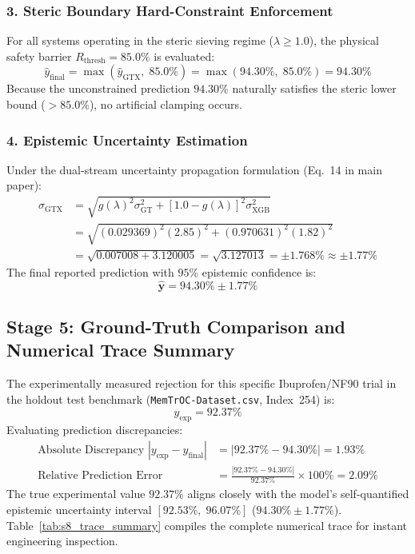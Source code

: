 \documentclass[11pt]{article}
\begin{document}
\subsubsection{3. Steric Boundary Hard-Constraint Enforcement}
For all systems operating in the steric sieving regime ($\lambda \ge 1.0$), the physical safety barrier $R_{\mathrm{thresh}} = 85.0\%$ is evaluated:
\begin{equation}
\hat{y}_{\mathrm{final}} = \max\left(\hat{y}_{\mathrm{GTX}}, \; 85.0\%\right) = \max(94.30\%, \; 85.0\%) = \mathbf{94.30\%}
\end{equation}
Because the unconstrained prediction $94.30\%$ naturally satisfies the steric lower bound ($>85.0\%$), no artificial clamping occurs.

\subsubsection{4. Epistemic Uncertainty Estimation}
Under the dual-stream uncertainty propagation formulation (Eq.~14 in main paper):
\begin{align}
\sigma_{\mathrm{GTX}} &= \sqrt{g(\lambda)^2 \sigma_{\mathrm{GT}}^2 + [1.0 - g(\lambda)]^2 \sigma_{\mathrm{XGB}}^2} \nonumber \\
&= \sqrt{(0.029369)^2 (2.85)^2 + (0.970631)^2 (1.82)^2} \nonumber \\
&= \sqrt{0.007008 + 3.120005} = \sqrt{3.127013} = \pm 1.768\% \approx \pm 1.77\%
\end{align}
\noindent The final reported prediction with $95\%$ epistemic confidence is:
\begin{equation}
\mathbf{\hat{y} = 94.30\% \pm 1.77\%}
\end{equation}

\subsection{Stage 5: Ground-Truth Comparison and Numerical Trace Summary}
\label{sec:walkthrough_summary}

The experimentally measured rejection for this specific Ibuprofen/NF90 trial in the holdout test benchmark (\texttt{MemTrOC-Dataset.csv}, Index~254) is:
\begin{equation}
y_{\mathrm{exp}} = 92.37\%
\end{equation}
Evaluating prediction discrepancies:
\begin{align}
\text{Absolute Discrepancy } |y_{\mathrm{exp}} - \hat{y}_{\mathrm{final}}| &= |92.37\% - 94.30\%| = \mathbf{1.93\%} \\
\text{Relative Prediction Error} &= \frac{|92.37\% - 94.30\%|}{92.37\%} \times 100\% = \mathbf{2.09\%}
\end{align}
The true experimental value $92.37\%$ aligns closely with the model's self-quantified epistemic uncertainty interval $[92.53\%, \; 96.07\%]$ ($94.30\% \pm 1.77\%$). Table~\ref{tab:s8_trace_summary} compiles the complete numerical trace for instant engineering inspection.
\end{document}
